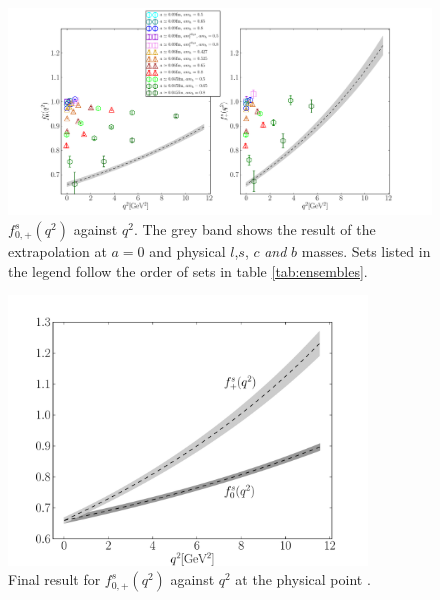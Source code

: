 \begin{figure}[htb!]
  \hspace{-85pt}
  \includegraphics[width=1.40\textwidth]{images/BsDs/direct/f0fp_vsq2.pdf}
  \caption{ $f_{0,+}^s(q^2)$ against $q^2$. The grey band shows the result of the extrapolation at $a=0$ and physical $l$,$s$, $c$ {\it{and}} $b$ masses. Sets listed in the legend follow the order of sets in table \ref{tab:ensembles}. \label{fig:directdata}}
\end{figure}

\begin{figure}[htb!]
  \begin{center}
  \includegraphics[width=0.85\textwidth]{images/BsDs/direct/f0fp_final.pdf}
  \caption{ Final result for $f_{0,+}^s(q^2)$ against $q^2$ at the physical point \label{fig:directfinal}.}
    \end{center}
\end{figure}

